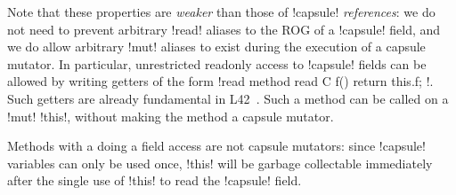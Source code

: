 
Note that these properties are \emph{weaker} than those of \Q!capsule! \emph{references}: we do not need to prevent arbitrary \Q!read! aliases to the ROG of a \Q!capsule! field, and we do allow arbitrary \Q!mut! aliases  to exist during the execution of a capsule mutator. In particular, unrestricted readonly access to \Q!capsule! fields can be allowed by writing getters of the form \Q!read method read C f() { return this.f; }!. Such getters are already fundamental in L42~\cite{DBLP:journals/programming/AroraSO19}. Such a method can be called on a \Q!mut! \Q!this!, without making the method a capsule mutator.

Methods with a \Q@capsule@ \Q@this@
doing a \Q@capsule@ field access are not capsule mutators: since \Q!capsule! variables can only be used once, \Q!this! will be garbage collectable immediately after the single use of \Q!this! to read the \Q!capsule! field.





